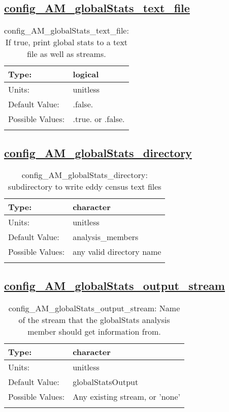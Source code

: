 \subsection[config\_AM\_globalStats\_text\_file]{\hyperref[sec:nm_tab_AM_globalStats]{config\_AM\_globalStats\_text\_file}}
\label{subsec:nm_sec_config_AM_globalStats_text_file}
\begin{center}
\begin{longtable}{| p{2.0in} || p{4.0in} |}
    \hline
    Type: & logical \\
    \hline
    Units: & \si{unitless} \\
    \hline
    Default Value: & .false. \\
    \hline
    Possible Values: & .true. or .false. \\
    \hline
    \caption{config\_AM\_globalStats\_text\_file: If true, print global stats to a text file as well as streams.}
\end{longtable}
\end{center}
\subsection[config\_AM\_globalStats\_directory]{\hyperref[sec:nm_tab_AM_globalStats]{config\_AM\_globalStats\_directory}}
\label{subsec:nm_sec_config_AM_globalStats_directory}
\begin{center}
\begin{longtable}{| p{2.0in} || p{4.0in} |}
    \hline
    Type: & character \\
    \hline
    Units: & \si{unitless} \\
    \hline
    Default Value: & analysis\_members \\
    \hline
    Possible Values: & any valid directory name \\
    \hline
    \caption{config\_AM\_globalStats\_directory: subdirectory to write eddy census text files}
\end{longtable}
\end{center}
\subsection[config\_AM\_globalStats\_output\_stream]{\hyperref[sec:nm_tab_AM_globalStats]{config\_AM\_globalStats\_output\_stream}}
\label{subsec:nm_sec_config_AM_globalStats_output_stream}
\begin{center}
\begin{longtable}{| p{2.0in} || p{4.0in} |}
    \hline
    Type: & character \\
    \hline
    Units: & \si{unitless} \\
    \hline
    Default Value: & globalStatsOutput \\
    \hline
    Possible Values: & Any existing stream, or 'none' \\
    \hline
    \caption{config\_AM\_globalStats\_output\_stream: Name of the stream that the globalStats analysis member should get information from.}
\end{longtable}
\end{center}
